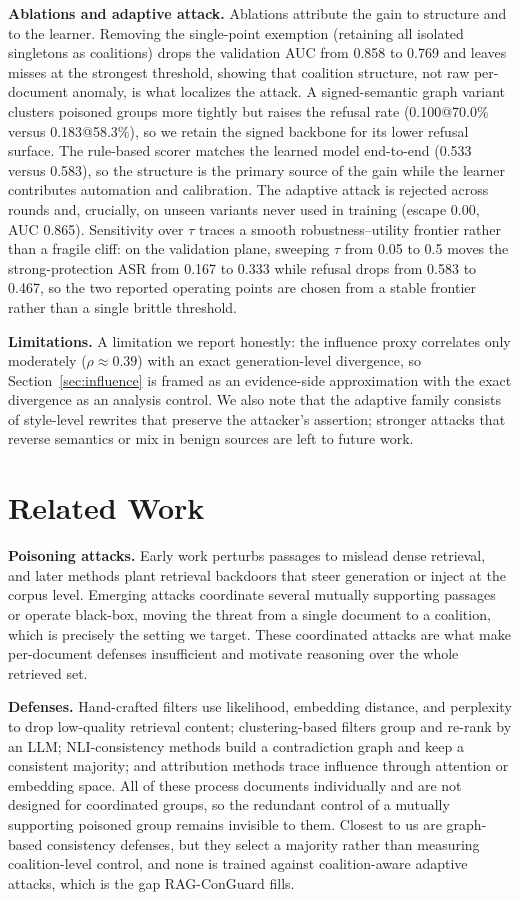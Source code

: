 \documentclass[sigconf]{acmart}
\begin{document}
\textbf{Ablations and adaptive attack.} Ablations attribute the gain to structure and to the learner. Removing the single-point exemption (retaining all isolated singletons as coalitions) drops the validation AUC from 0.858 to 0.769 and leaves misses at the strongest threshold, showing that coalition structure, not raw per-document anomaly, is what localizes the attack. A signed-semantic graph variant clusters poisoned groups more tightly but raises the refusal rate (0.100@70.0\% versus 0.183@58.3\%), so we retain the signed backbone for its lower refusal surface. The rule-based scorer matches the learned model end-to-end (0.533 versus 0.583), so the structure is the primary source of the gain while the learner contributes automation and calibration. The adaptive attack is rejected across rounds and, crucially, on unseen variants never used in training (escape 0.00, AUC 0.865). Sensitivity over $\tau$ traces a smooth robustness--utility frontier rather than a fragile cliff: on the validation plane, sweeping $\tau$ from 0.05 to 0.5 moves the strong-protection ASR from 0.167 to 0.333 while refusal drops from 0.583 to 0.467, so the two reported operating points are chosen from a stable frontier rather than a single brittle threshold.

\textbf{Limitations.} A limitation we report honestly: the influence proxy correlates only moderately ($\rho\approx0.39$) with an exact generation-level divergence, so Section~\ref{sec:influence} is framed as an evidence-side approximation with the exact divergence as an analysis control. We also note that the adaptive family consists of style-level rewrites that preserve the attacker's assertion; stronger attacks that reverse semantics or mix in benign sources are left to future work.

\section{Related Work}

\textbf{Poisoning attacks.} Early work perturbs passages to mislead dense retrieval, and later methods plant retrieval backdoors that steer generation or inject at the corpus level. Emerging attacks coordinate several mutually supporting passages or operate black-box, moving the threat from a single document to a coalition, which is precisely the setting we target. These coordinated attacks are what make per-document defenses insufficient and motivate reasoning over the whole retrieved set.

\textbf{Defenses.} Hand-crafted filters use likelihood, embedding distance, and perplexity to drop low-quality retrieval content; clustering-based filters group and re-rank by an LLM; NLI-consistency methods build a contradiction graph and keep a consistent majority; and attribution methods trace influence through attention or embedding space. All of these process documents individually and are not designed for coordinated groups, so the redundant control of a mutually supporting poisoned group remains invisible to them. Closest to us are graph-based consistency defenses, but they select a majority rather than measuring coalition-level control, and none is trained against coalition-aware adaptive attacks, which is the gap RAG-ConGuard fills.
\end{document}
